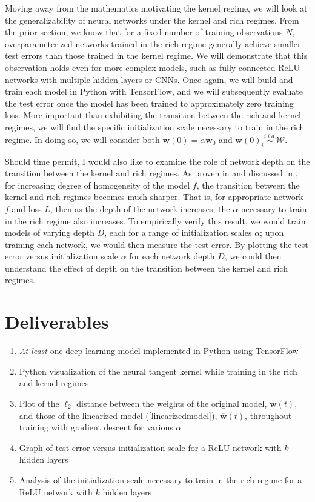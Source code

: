\documentclass{article}
\begin{document}
Moving away from the mathematics motivating the kernel regime, we will look at the generalizability of neural networks under the kernel and rich regimes. From the prior section, we know that for a fixed number of training observations $N$, overparameterized networks trained in the rich regime generally achieve smaller test errors than those trained in the kernel regime. We will demonstrate that this observation holds even for more complex models, such as fully-connected ReLU networks with multiple hidden layers or CNNs. Once again, we will build and train each model in Python with TensorFlow, and we will subsequently evaluate the test error once the model has been trained to approximately zero training loss. More important than exhibiting the transition between the rich and kernel regimes, we will find the specific initialization scale necessary to train in the rich regime. In doing so, we will consider both $\boldsymbol{w}(0) = \alpha \boldsymbol{w}_0$ and $\boldsymbol{w}(0)_i \overset{i.i.d.}{\sim} \mathcal{W}$.

Should time permit, I would also like to examine the role of network depth on the transition between the kernel and rich regimes. As proven in \cite{arora2019implicit} and discussed in \cite{woodworth2020kernel}, for increasing degree of homogeneity of the model $f$, the transition between the kernel and rich regimes becomes much sharper. That is, for appropriate network $f$ and loss $L$, then as the depth of the network increases, the $\alpha$ necessary to train in the rich regime also increases. To empirically verify this result, we would train models of varying depth $D$, each for a range of initialization scales $\alpha$; upon training each network, we would then measure the test error. By plotting the test error versus initialization scale $\alpha$ for each network depth $D$, we could then understand the effect of depth on the transition between the kernel and rich regimes. 
\subsection{}

\section{Deliverables}
\begin{enumerate}
    \item \textit{At least} one deep learning model implemented in Python using TensorFlow
    \item Python visualization of the neural tangent kernel while training in the rich and kernel regimes
    \item Plot of the $\ell_2$ distance between the weights of the original model, $\boldsymbol{w}(t)$, and those of the linearized model (\ref{linearizedmodel}), $\overline{\boldsymbol{w}}(t)$, throughout training with gradient descent for various $\alpha$
    \item Graph of test error versus initialization scale for a ReLU network with $k$ hidden layers
    \item Analysis of the initialization scale necessary to train in the rich regime for a ReLU network with $k$ hidden layers
\end{enumerate}
\end{document}

